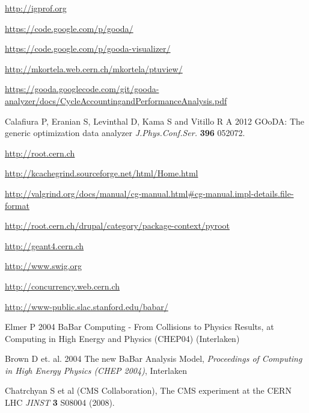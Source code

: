 \documentclass[notitlepage,letter,12pt]{article}
\begin{document}
\begin{thebibliography}{0}




 \url{http://igprof.org}

 \url{https://code.google.com/p/gooda/}

 \url{https://code.google.com/p/gooda-visualizer/}

 \url{http://mkortela.web.cern.ch/mkortela/ptuview/}

 \url{https://gooda.googlecode.com/git/gooda-analyzer/docs/CycleAccountingandPerformanceAnalysis.pdf}

 Calafiura P, Eranian S, Levinthal D, Kama S and Vitillo R A  2012 GOoDA: The generic optimization data analyzer {\it J.Phys.Conf.Ser.} {\bf 396} 052072.

 \url{http://root.cern.ch}

 \url{http://kcachegrind.sourceforge.net/html/Home.html}

 \url{http://valgrind.org/docs/manual/cg-manual.html\#cg-manual.impl-details.file-format}

 \url{http://root.cern.ch/drupal/category/package-context/pyroot}

 \url{http://geant4.cern.ch}

 \url{http://www.swig.org}

 \url{http://concurrency.web.cern.ch}

 \url{http://www-public.slac.stanford.edu/babar/}

 Elmer P 2004 BaBar Computing - From Collisions to Physics Results, at Computing in High Energy and Physics (CHEP04) (Interlaken)

 Brown D et. al. 2004 The new BaBar Analysis Model, {\it Proceedings of Computing in High Energy Physics (CHEP 2004)}, Interlaken

 Chatrchyan S et al (CMS Collaboration),  The CMS experiment at the CERN LHC {\it JINST} {\bf 3} S08004 (2008).


\end{thebibliography}
\end{document}
